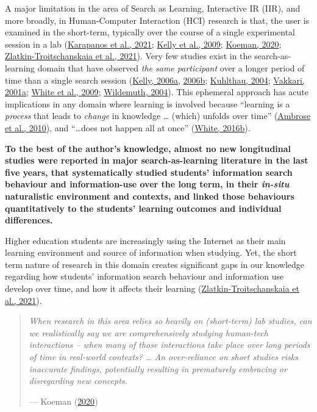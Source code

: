 \documentclass[letterpaper, nobind]{templates/ociamthesis}
\begin{document}
A major limitation in the area of Search as Learning, Interactive IR (IIR), and more broadly, in Human-Computer Interaction (HCI) research is
that, the user is examined in the short-term, typically over the course of a single experimental session in a lab
(\protect\hyperlink{ref-karapanos2021advances}{Karapanos et al., 2021}; \protect\hyperlink{ref-kelly2009evaluation}{Kelly et al., 2009}; \protect\hyperlink{ref-koeman2020hciux}{Koeman, 2020}; \protect\hyperlink{ref-zlatkin2021students}{Zlatkin-Troitschanskaia et al., 2021}).
Very few studies exist in the search-as-learning domain that have observed \emph{the same participant} over a longer period of time than a single search session (\protect\hyperlink{ref-kelly2006measuringa}{Kelly, 2006a}, \protect\hyperlink{ref-kelly2006measuringb}{2006b}; \protect\hyperlink{ref-kuhlthau2004seeking}{Kuhlthau, 2004}; \protect\hyperlink{ref-vakkari2001changes}{Vakkari, 2001a}; \protect\hyperlink{ref-white2009characterizing}{White et al., 2009}; \protect\hyperlink{ref-wildemuth2004effects}{Wildemuth, 2004}).
This ephemeral approach has acute implications in any domain where learning is involved because ``learning is a \emph{process} that leads to \emph{change} in knowledge \ldots{} (which) unfolds over time'' (\protect\hyperlink{ref-ambrose2010howa}{Ambrose et al., 2010}), and ``\ldots does not happen all at once'' (\protect\hyperlink{ref-white-2016-iwss-learning}{White, 2016b}).

\textbf{To the best of the author's knowledge, almost no new longitudinal studies were reported in major search-as-learning literature in the last five years, that systematically studied students' information search behaviour and information-use over the long term, in their \emph{in-situ} naturalistic environment and contexts, and linked those behaviours quantitatively to the students' learning outcomes and individual differences.}

Higher education students are increasingly using the Internet as their main learning environment and source of information when studying. Yet, the short term nature of research in this domain creates significant gaps in our knowledge regarding how students' information search behaviour and information use develop over time, and how it affects their learning (\protect\hyperlink{ref-zlatkin2021students}{Zlatkin-Troitschanskaia et al., 2021}).

\begin{quote}
\emph{When research in this area relies so heavily on (short-term) lab studies, can we realistically say we are comprehensively studying human-tech interactions -- when many of those interactions take place over long periods of time in real-world contexts? \ldots{} An over-reliance on short studies risks inaccurate findings, potentially resulting in prematurely embracing or disregarding new concepts.}

\hfill --- Koeman (\protect\hyperlink{ref-koeman2020hciux}{2020})
\end{quote}
\end{document}
